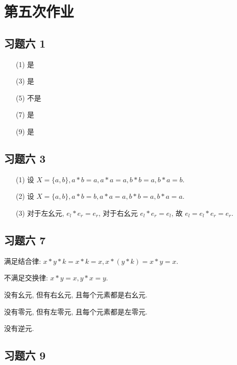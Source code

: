 \chapter{第五次作业}

\section{习题六 1}

\begin{solution}
\begin{itemize}
	\item[(1)] 是
	\item[(3)] 是
	\item[(5)] 不是
	\item[(7)] 是
	\item[(9)] 是
\end{itemize}
\end{solution}
\section{习题六 3}

\begin{solution}
\begin{itemize}
	\item[(1)] 设 $X=\{a,b\},a*b=a,a*a=a,b*b=a,b*a=b$.
	\item[(2)] 设 $X=\{a,b\},a*b=b,a*a=a,b*b=a,b*a=a$.
	\item[(3)] 对于左幺元, $e_l*e_r=e_r$, 对于右幺元 $e_l*e_r=e_l$, 故 $e_l=e_l*e_r=e_r$.
\end{itemize}
\end{solution}

\section{习题六 7}

\begin{solution}
	满足结合律: $x*y*k=x*k=x,x*(y*k)=x*y=x$.
	
	不满足交换律: $x*y=x,y*x=y$.
	
	没有幺元, 但有右幺元, 且每个元素都是右幺元.
	
	没有零元, 但有左零元, 且每个元素都是左零元.
	
	没有逆元.	
\end{solution}

\section{习题六 9}

